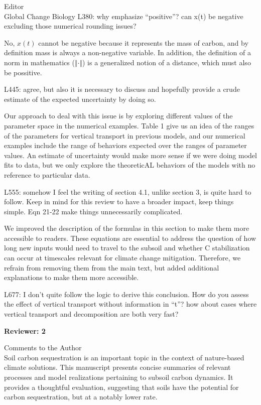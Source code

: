 \documentclass[11pt]{bgcletter}
\newcommand{\answer}[1] {
{\color{cyan} #1}
}
\begin{document}
\begin{letter}{Editor\\
   Global Change Biology
}
L380: why emphasize ``positive''? can x(t) be negative excluding those numerical rounding issues? 

\answer{No, $x(t)$ cannot be negative because it represents the mass of carbon, and by definition mass is always a non-negative variable. In addition, the definition of a norm in mathematics ($\Vert \cdot \Vert$) is a generalized notion of a distance, which must also be possitive. }

L445: agree, but also it is necessary to discuss and hopefully provide a crude estimate of the expected uncertainty by doing so.

\answer{Our approach to deal with this issue is by exploring different values of the parameter space in the numerical examples. Table 1 give us an idea of the ranges of the parameters for vertical transport in previous models, and our numerical examples include the range of behaviors expected over the ranges of parameter values. An estimate of uncertainty would make more sense if we were doing model fits to data, but we only explore the theoreticAL behaviors of the models with no reference to particular data.}

L555: somehow I feel the writing of section 4.1, unlike section 3, is quite hard to follow. Keep in mind for this review to have a broader impact, keep things simple. Eqn 21-22 make things unnecessarily complicated.

\answer{We improved the description of the formulas in this section to make them more accessible to readers. These equations are essential to address the question of how long new inputs would need to travel to the subsoil and whether C stabilization can occur at timescales relevant for climate change mitigation. Therefore, we refrain from removing them from the main text, but added additional explanations to make them more accessible.}

L677: I don't quite follow the logic to derive this conclusion. How do you assess the effect of vertical transport without information in ``t''? how about cases where vertical transport and decomposition are both very fast?

\newpage

\textbf{Reviewer: 2}

Comments to the Author \\
Soil carbon sequestration is an important topic in the context of nature-based climate solutions. This manuscript presents concise summaries of relevant processes and model realizations pertaining to subsoil carbon dynamics. It provides a thoughtful evaluation, suggesting that soils have the potential for carbon sequestration, but at a notably lower rate.


\end{letter}
\end{document}

